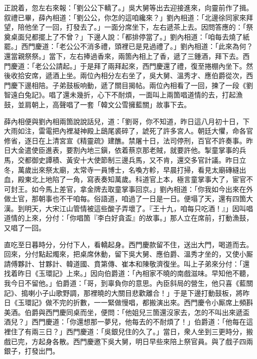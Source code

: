 正說着，忽左右來報：「劉公公下轎了。」吳大舅等出去迎接進來，向靈前作了揖。叙禮已畢，薛內相道：「劉公公，你怎的這咱纔來？」劉內相道：「北邊徐同家來拜望，陪他坐了一回，打發去了。」一面分席坐下，左右遞茶上去。因問答應的：「祭奠桌面兒都擺上了不曾？」下邊人說：「都排停當了。」劉內相道：「咱每去燒了紙罷。」西門慶道：「老公公不消多禮，頭裡已是見過禮了。」劉內相道：「此來為何？還當親祭祭。」當下，左右捧過香來，兩箇內相上了香，遞了三鍾酒，拜下去。西門慶道：「老公公請起。」于是拜了兩拜起來，西門慶還了禮，復至捲棚內坐下。然後收拾安席，遞酒上坐。兩位內相分左右坐了，吳大舅、溫秀才、應伯爵從次，西門慶下邊相陪。子弟鼓板响動，遞了關目揭帖。兩位內相看了一回，揀了一段《劉智遠白兔記》。唱了還未幾折，心下不耐煩，一面叫上兩箇唱道情的去，打起漁鼓，並肩朝上，高聲唱了一套「韓文公雪擁藍關」故事下去。

薛內相便與劉內相兩箇說說話兒，道：「劉哥，你不知道，昨日這八月初十日，下大雨如注，雷電把內裡凝神殿上鴟尾裘碎了，諕死了許多宮人。朝廷大懼，命各官修省，逐日在上清宮宣《精靈疏》建醮。禁屠十日，法司停刑，百官不許奏事。昨日大金遣使臣進表，要割內地三鎭，依着蔡京那老賊，{}就要許他。掣童掌事的兵馬，交都御史譚積、黃安十大使節制三邊兵馬，又不肯，還交多官計議。昨日立冬，萬歲出來祭太廟，太常寺一員博士，名喚方軫，早晨打掃，看見太廟磚縫出血，殿東北上地陷了一角，{}寫表奏知萬歲。科道官上本，極言童掌事大了，宦官不可封王。如今馬上差官，拿金牌去取童掌事回京。」劉內相道：「你我如今出來在外做土官，那朝事也不干咱每。俗語道，咱過了一日是一日。便塌了天，還有四箇大漢。到明天，大宋江山管情被這些酸子弄壞了。{}『王十九，咱每只吃酒！』」因叫唱道情的上來，分付：「你唱箇『李白好貪盃』的故事。」{}那人立在席前，打動漁鼓，又唱了一回。

直吃至日暮時分，分付下人，看轎起身。西門慶款留不住，送出大門，喝道而去。回來，分付點起燭來，把桌席休動，留下吳大舅、應伯爵、溫秀才坐的，又使小厮請傅夥計、甘夥計、韓道國、賁第傳、崔本和陳敬濟復坐。叫上子弟來分付：「還找着昨日《玉環記》上來。」因向伯爵道：「內相家不曉的南戲滋味。早知他不聽，我今日不留他。」伯爵道：「哥，到辜負你的意思。內臣斜局的營生，他只喜《藍關記》、搗喇小子山歌野調，那裡曉的大關目悲歡離合！」于是下邊打動鼓板，將昨日《玉環記》做不完的折數，一一緊做慢唱，都搬演出來。西門慶令小厮席上頻斟美酒。伯爵與西門慶同桌而坐，便問：「他姐兒三箇還沒家去，怎的不叫出來遞盃酒兒？」{}西門慶道：「你還想那一夢兒，他每去的不耐煩了！」伯爵道：「他每在這裡住了有兩三日？」西門慶道：「吳銀兒住的久了。」當日，衆人坐到三更時分，搬戲已完，方起身各散。西門慶邀下吳大舅，明日早些來陪上祭官員。與了戲子四兩銀子，打發出門。

